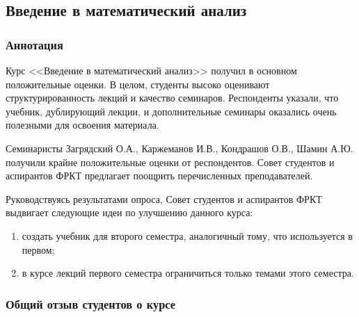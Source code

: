 \subsection{Введение в математический анализ}
	
	\subsubsection{Аннотация}

		Курс <<Введение в математический анализ>> получил в основном положительные оценки. В целом, студенты высоко оценивают структурированность лекций и качество семинаров. Респонденты указали, что учебник, дублирующий лекции, и дополнительные семинары оказались очень полезными для освоения материала.

		Семинаристы Загрядский О.А., Каржеманов И.В., Кондрашов О.В., Шамин А.Ю. получили крайне положительные оценки от респондентов. Совет студентов и аспирантов ФРКТ предлагает поощрить перечисленных преподавателей.

		Руководствуясь результатами опроса, Совет студентов и аспирантов ФРКТ выдвигает следующие идеи по улучшению данного курса:
		\begin{enumerate}
			\item создать учебник для второго семестра, аналогичный тому, что используется в первом;
			\item в курсе лекций первого семестра ограничиться только темами этого семестра. 
		\end{enumerate}


	\subsubsection{Общий отзыв студентов о курсе}

